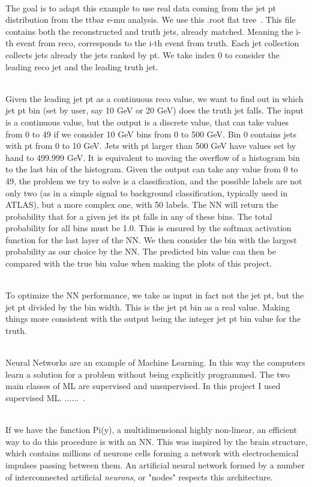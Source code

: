 \documentclass[a4paper,11pt,twoside]{article}
\begin{document}
\ \\The goal is to adapt this example to use real data coming from the jet pt distribution from the ttbar e-mu analysis. We use this .root flat tree~\cite{RootFile}.
This file contains both the reconstructed and truth jets, already matched. Meaning the i-th event from reco, corresponds to the i-th event from truth. Each jet collection collects jets already the jets ranked by pt. We take index 0 to consider the leading reco jet and the leading truth jet.

\ \\Given the leading jet pt as a continuous reco value, we want to find out in which jet pt bin (set by user, say 10 GeV or 20 GeV) does the truth jet falls. The input is a continuous value, but the output is a discrete value, that can take values from 0 to 49 if we consider 10 GeV bins from 0 to 500 GeV. Bin 0 contains jets with pt from 0 to 10 GeV. Jets with pt larger than 500 GeV have values set by hand to 499.999 GeV. It is equivalent to moving the overflow of a histogram bin to the last bin of the histogram. Given the output can take any value from 0 to 49, the problem we try to solve is a classification, and the possible labels are not only two (as in a simple signal to background classification, typically used in ATLAS), but a more complex one, with 50 labels. The NN will return the probability that for a given jet its pt falls in any of these bins. The total probability for all bins must be 1.0. This is ensured by the softmax activation function for the last layer of the NN. We then consider the bin with the largest probability as our choice by the NN. The predicted bin value can then be compared with the true bin value when making the plots of this project.

\ \\To optimize the NN performance, we take as input in fact not the jet pt, but the jet pt divided by the bin width. This is the jet pt bin as a real value. Making things more consistent with the output being the integer jet pt bin value for the truth.

\ \\ Neural Networks are an example of Machine Learning. In this way the computers learn a solution for a problem without being explicitly programmed. The two main classes of ML are supervised and unsupervised. 
In this project I used supervised ML. ......~\cite{AndrewNg}.

\ \\If we have the function Pi(y), a multidimensional highly non-linear, an efficient way to do this procedure is with an NN. This was inspired by the brain structure, which contains millions of neurone cells forming a network with electrochemical impulses passing between them. An artificial neural network formed by a number of interconnected artificial \emph{neurons}, or "nodes" respects this architecture. 
\end{document}
